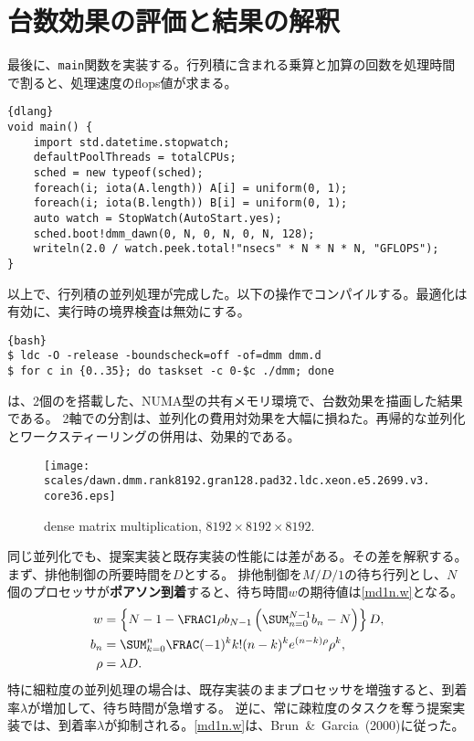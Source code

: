 \documentclass[10pt,a4paper]{book}
\begin{document}
\section{台数効果の評価と結果の解釈}

最後に、\texttt{main}関数を実装する。行列積に含まれる乗算と加算の回数を処理時間で割ると、処理速度のflops値が求まる。

\begin{Verbatim}{dlang}
void main() {
	import std.datetime.stopwatch;
	defaultPoolThreads = totalCPUs;
	sched = new typeof(sched);
	foreach(i; iota(A.length)) A[i] = uniform(0, 1);
	foreach(i; iota(B.length)) B[i] = uniform(0, 1);
	auto watch = StopWatch(AutoStart.yes);
	sched.boot!dmm_dawn(0, N, 0, N, 0, N, 128);
	writeln(2.0 / watch.peek.total!"nsecs" * N * N * N, "GFLOPS");
}
\end{Verbatim}

以上で、行列積の並列処理が完成した。以下の操作でコンパイルする。最適化は有効に、実行時の境界検査は無効にする。

\begin{Verbatim}{bash}
$ ldc -O -release -boundscheck=off -of=dmm dmm.d
$ for c in {0..35}; do taskset -c 0-$c ./dmm; done
\end{Verbatim}

は、2個の\CPU{}を搭載した、NUMA型の共有メモリ環境で、台数効果を描画した結果である。
2軸での分割は、並列化の費用対効果を大幅に損ねた。再帰的な並列化とワークスティーリングの併用は、効果的である。

\begin{figure}[h]
\centering
\texttt{[image: scales/dawn.dmm.rank8192.gran128.pad32.ldc.xeon.e5.2699.v3.core36.eps]}
\caption{dense matrix multiplication, $8192\times8192\times8192$.\label{fig:dawn.dmm}}
\end{figure}

同じ並列化でも、提案実装と既存実装の性能には差がある。その差を解釈する。まず、排他制御の所要時間を$D$とする。
排他制御を$M/D/1$の待ち行列とし、$N$個のプロセッサが\textbf{ポアソン到着}すると、待ち時間$w$の期待値は\eqref{md1n.w}となる。
%
\begin{alignat}{1}
\label{eq:md1n.w}
w &= \seq{N-1-\frac{1}{\rho b_{N-1}}\tup{\sum_{n=0}^{N-1}b_n-N}}D,\\
b_n &= \sum_{k=0}^n\frac{(-1)^k}{k!}(n-k)^ke^{(n-k)\rho}\rho^k,\\
\rho &= \lambda D.
\end{alignat}
%
特に細粒度の並列処理の場合は、既存実装のままプロセッサを増強すると、到着率$\lambda$が増加して、待ち時間が急増する。
逆に、常に疎粒度のタスクを奪う提案実装では、到着率$\lambda$が抑制される。\eqref{md1n.w}は、Brun~\&~Garcia~(2000)に従った。
\end{document}
